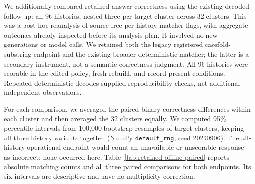 
We additionally compared retained-answer correctness using the existing decoded
follow-up: all 96 histories, nested three per target cluster across 32 clusters.
This was a post hoc reanalysis of source-free per-history matcher flags, with
aggregate outcomes already inspected before its analysis plan. It involved no
new generations or model calls. We retained both the legacy registered
casefold-substring endpoint and the existing broader deterministic matcher;
the latter is a secondary instrument, not a semantic-correctness judgment.
All 96 histories were scorable in the edited-policy, fresh-rebuild, and
record-present conditions. Repeated deterministic decodes supplied
reproducibility checks, not additional independent observations.

For each comparison, we averaged the paired binary correctness differences
within each cluster and then averaged the 32 clusters equally. We computed
95\% percentile intervals from 100{,}000 bootstrap resamples of target clusters,
keeping all three history variants together (NumPy \texttt{default\_rng},
seed 20260906). The all-history operational endpoint would count an unavailable
or unscorable response as incorrect; none occurred here. Table~\ref{tab:retained-offline-paired}
reports absolute matching counts and all three paired comparisons for both
endpoints. Its six intervals are descriptive and have no multiplicity correction.

